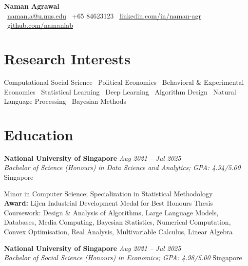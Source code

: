 \documentclass[10pt,a4paper]{article}
\newcommand{\cventry}[4]{%
\textbf{#1} \hfill \textit{#2} \\
\textit{#3} \hfill #4
\vspace{2pt}
}
\begin{document}
\begin{center}
{\LARGE\bfseries\textcolor{primary}{Naman Agrawal}}\\[6pt]
{\small
\faEnvelope\ \href{mailto:naman.a@u.nus.edu}{naman.a@u.nus.edu} \quad
\faPhone\ +65 84623123 \quad
\faLinkedin\ \href{https://linkedin.com/in/naman-agr}{linkedin.com/in/naman-agr} \quad
\faGithub\ \href{https://github.com/namanlab}{github.com/namanlab}
}
\end{center}

\vspace{-4pt}

\section{Research Interests}
Computational Social Science  \textbullet\ Political Economics  \textbullet\ Behavioral \& Experimental Economics  \textbullet\ Statistical Learning \textbullet\ Deep Learning \textbullet\ Algorithm Design \textbullet\ Natural Language Processing \textbullet\ Bayesian Methods 


\section{Education}

\cventry{National University of Singapore}{Aug 2021 -- Jul 2025}{Bachelor of Science (Honours) in Data Science and Analytics; GPA: 4.94/5.00}{Singapore}

Minor in Computer Science; Specialization in Statistical Methodology\\
\textbf{Award:} Lijen Industrial Development Medal for Best Honours Thesis\\
Coursework: Design \& Analysis of Algorithms, Large Language Models, Databases, Media Computing, Bayesian Statistics, Numerical Computation, Convex Optimisation, Real Analysis, Multivariable Calculus, Linear Algebra

\vspace{6pt}

\cventry{National University of Singapore}{Aug 2021 -- Jul 2025}{Bachelor of Social Science (Honours) in Economics; GPA: 4.98/5.00}{Singapore}
\end{document}
